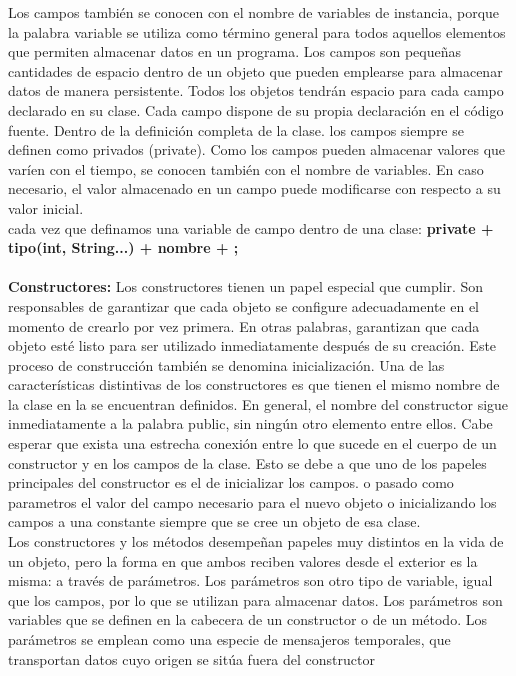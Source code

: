 \documentclass[11pt,a4paper]{article}
\begin{document}
	Los campos también se conocen con el
	nombre de variables de instancia, porque la palabra variable se utiliza como término general
	para todos aquellos elementos que permiten almacenar datos en un programa. Los campos son pequeñas cantidades de espacio dentro de un objeto que pueden emplearse para
	almacenar datos de manera persistente. Todos los objetos tendrán espacio para cada campo declarado
	en su clase. Cada campo dispone de su propia declaración en el código fuente. Dentro de la definición completa
	de la clase. los campos siempre se definen como privados (private). Como los campos pueden almacenar valores que varíen con el tiempo, se conocen también con
	el nombre de variables. En caso necesario, el valor almacenado en un campo puede modificarse
	con respecto a su valor inicial. \\
	cada vez que definamos una variable de campo dentro
	de una clase: \textbf{private + tipo(int, String...) + nombre + ;}\\
	\\
	\textbf{Constructores:} Los constructores tienen un papel especial que cumplir. Son responsables de garantizar que cada
	objeto se configure adecuadamente en el momento de crearlo por vez primera. En otras palabras,
	garantizan que cada objeto esté listo para ser utilizado inmediatamente después de su creación.
	Este proceso de construcción también se denomina inicialización.
	Una de las características distintivas de los constructores es que tienen el mismo nombre de la
	clase en la se encuentran definidos. En general, el nombre del constructor
	sigue inmediatamente a la palabra public, sin ningún otro elemento entre ellos. Cabe esperar que exista una estrecha conexión entre lo que sucede en el cuerpo de un constructor
	y en los campos de la clase. Esto se debe a que uno de los papeles principales del constructor es
	el de inicializar los campos. o pasado como parametros el valor del campo necesario para el nuevo objeto o inicializando los campos a una constante siempre que se cree un objeto de esa clase.\\
	Los constructores y los métodos desempeñan papeles muy distintos en la vida de un objeto, pero
	la forma en que ambos reciben valores desde el exterior es la misma: a través de parámetros. Los parámetros son otro tipo de variable, igual que los campos, por lo que se utilizan para almacenar
	datos. Los parámetros son variables que se definen en la cabecera de un constructor o de un
	método. Los parámetros se emplean como
	una especie de mensajeros temporales, que transportan datos cuyo origen se sitúa fuera del constructor
\end{document}

